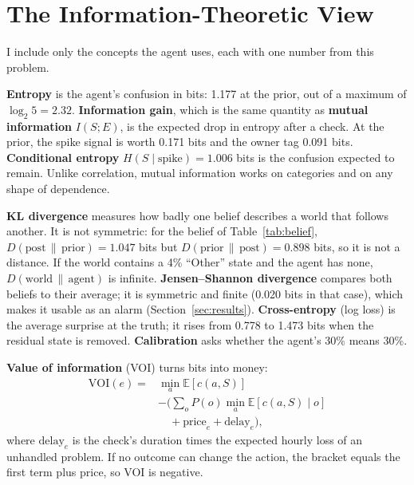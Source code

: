 \documentclass{article}
\begin{document}
\section{The Information-Theoretic View}
\label{sec:info}

I include only the concepts the agent uses, each with one number from this problem.

\textbf{Entropy} is the agent's confusion in bits: 1.177 at the prior, out of a maximum of $\log_2 5 = 2.32$. \textbf{Information gain}, which is the same quantity as \textbf{mutual information} $I(S;E)$, is the expected drop in entropy after a check. At the prior, the spike signal is worth 0.171 bits and the owner tag 0.091 bits. \textbf{Conditional entropy} $H(S\mid\text{spike}) = 1.006$ bits is the confusion expected to remain. Unlike correlation, mutual information works on categories and on any shape of dependence.

\textbf{KL divergence} measures how badly one belief describes a world that follows another. It is not symmetric: for the belief of Table~\ref{tab:belief}, $D(\text{post}\,\|\,\text{prior}) = 1.047$ bits but $D(\text{prior}\,\|\,\text{post}) = 0.898$ bits, so it is not a distance. If the world contains a 4\% ``Other'' state and the agent has none, $D(\text{world}\,\|\,\text{agent})$ is infinite. \textbf{Jensen--Shannon divergence} compares both beliefs to their average; it is symmetric and finite (0.020 bits in that case), which makes it usable as an alarm (Section~\ref{sec:results}). \textbf{Cross-entropy} (log loss) is the average surprise at the truth; it rises from 0.778 to 1.473 bits when the residual state is removed. \textbf{Calibration} asks whether the agent's 30\% means 30\%.

\textbf{Value of information} (VOI) turns bits into money:
\begin{equation}
\begin{split}
\mathrm{VOI}(e) ={}& \min_a \mathbb{E}[c(a,S)] \\
& - \Big(\textstyle\sum_o P(o)\min_a \mathbb{E}[c(a,S)\mid o] \\
& \quad + \text{price}_e + \text{delay}_e\Big),
\end{split}
\end{equation}
where $\text{delay}_e$ is the check's duration times the expected hourly loss of an unhandled problem. If no outcome can change the action, the bracket equals the first term plus price, so VOI is negative.
\end{document}
